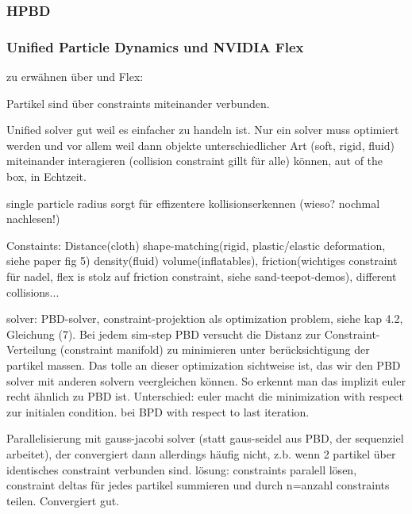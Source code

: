 \subsubsection{HPBD}

\subsubsection{Unified Particle Dynamics und NVIDIA Flex}
zu erwähnen über \cite{UPP} und Flex: 

Partikel sind über constraints miteinander verbunden.

Unified solver gut weil es einfacher zu handeln ist. Nur ein solver muss optimiert werden und vor allem weil dann objekte unterschiedlicher Art (soft, rigid, fluid) miteinander interagieren (collision constraint gillt für alle) können, aut of the box, in Echtzeit.

single particle radius sorgt für effizentere kollisionserkennen (wieso? nochmal nachlesen!)

Constaints: Distance(cloth) shape-matching(rigid, plastic/elastic deformation, siehe paper fig 5) density(fluid) volume(inflatables), friction(wichtiges constraint für nadel, flex is stolz auf friction constraint, siehe sand-teepot-demos), different collisions...

solver: PBD-solver, \cite{UPP} constraint-projektion als optimization problem, siehe kap 4.2, Gleichung (7). Bei jedem sim-step PBD versucht die Distanz zur Constraint-Verteilung (constraint manifold) zu minimieren unter berücksichtigung der partikel massen. Das tolle an dieser optimization sichtweise ist, das wir den PBD solver mit anderen solvern veergleichen können. So erkennt man das implizit euler recht ähnlich zu PBD ist. Unterschied: euler macht die minimization with respect zur initialen condition. bei BPD with respect to last iteration.

Parallelisierung mit gauss-jacobi solver (statt gaus-seidel aus PBD, der sequenziel arbeitet), der convergiert dann allerdings häufig nicht, z.b. wenn 2 partikel über identisches constraint verbunden sind. lösung: constraints paralell lösen, constraint deltas für jedes partikel summieren und durch n=anzahl constraints teilen. Convergiert gut. 





